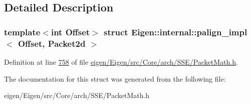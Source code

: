 \subsection{Detailed Description}
\subsubsection*{template$<$int Offset$>$\newline
struct Eigen\+::internal\+::palign\+\_\+impl$<$ Offset, Packet2d $>$}



Definition at line \hyperlink{eigen_2_eigen_2src_2_core_2arch_2_s_s_e_2_packet_math_8h_source_l00758}{758} of file \hyperlink{eigen_2_eigen_2src_2_core_2arch_2_s_s_e_2_packet_math_8h_source}{eigen/\+Eigen/src/\+Core/arch/\+S\+S\+E/\+Packet\+Math.\+h}.



The documentation for this struct was generated from the following file\+:\begin{DoxyCompactItemize}
\item 
eigen/\+Eigen/src/\+Core/arch/\+S\+S\+E/\+Packet\+Math.\+h\end{DoxyCompactItemize}
